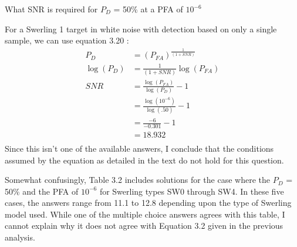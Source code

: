 \documentclass[12pt]{article}
\newcommand\SNR{\mathit{SNR}} %
\newenvironment{exercise}[2][Exercise]{\begin{trivlist}
    \item[\hskip \labelsep {\bfseries #1}\hskip \labelsep {\bfseries #2.}]}{\end{trivlist}}
\begin{document}
      \begin{exercise}{8}
      What SNR is required for $P_{D}$ = 50\% at a PFA of $10^{-6}$

      For a Swerling 1 target in white noise with detection based on only a single sample, we can use equation 3.20 \cite[p.~108]{POMP}:
%
      \begin{align*}
      P_{D} & = (P_{FA}) ^ {\frac {1} { (1+\SNR)} }\\
      \log{(P_{D})} & = \frac {1} { (1+\SNR)} \log{(P_{FA})}\\
      \SNR & = \frac{ \log{( P_{FA} )} } { \log{(P_{D})} } - 1\\
      & = \frac{ \log{( 10^{-6} )} } { \log{(.50)} } - 1\\
      & = \frac{-6}{-0.301} - 1\\
      & = 18.932\\
      \end{align*}
      Since this isn't one of the available answers, I conclude that the conditions assumed by the equation as detailed in the text do not hold for this question. 

      Somewhat confusingly, Table 3.2 \cite[103]{POMR} includes solutions for the case where the $P_{D}$ = 50\% and the PFA of $10^{-6}$ for Swerling types SW0 through SW4. In these five cases, the answers range from 11.1 to 12.8 depending upon the type of Swerling model used. While one of the multiple choice answers agrees with this table, I cannot explain why it does not agree with Equation 3.2 given in the previous analysis. 

      \end{exercise}
\end{document}
